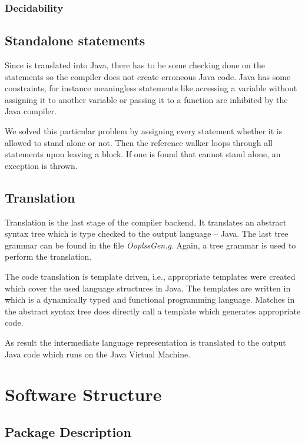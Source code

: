 \subsubsection{Decidability}

\subsection{Standalone statements}
Since \ooplss is translated into Java, there has to be some checking
done on the statements so the compiler does not create erroneous Java
code. Java has some constraints, for instance meaningless statements
like accessing a variable without assigning it to another variable
or passing it to a function are inhibited by the Java compiler.

We solved this particular problem by assigning every statement whether
it is allowed to stand alone or not. Then the reference walker loops
through all statements upon leaving a block. If one is found that cannot
stand alone, an exception is thrown.

\subsection{Translation}
Translation is the last stage of the compiler backend. It
translates an abstract syntax tree which is type checked to the
output language -- Java. The last tree grammar can be found in the
file \emph{OoplssGen.g}. Again, a tree grammar is used to perform the
translation.

The code translation is template driven, i.e., appropriate templates
were created which cover the used language structures in Java. The
templates are written in \st which is a dynamically typed and functional
programming language. Matches in the abstract syntax tree does directly
call a template which generates appropriate code.

As result the intermediate language representation is translated to the
output Java code which runs on the Java Virtual Machine.

\section{Software Structure}

\subsection{Package Description}

